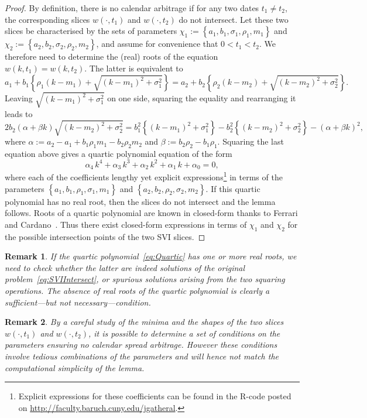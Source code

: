 \documentclass[12pt]{article}
\newtheorem{remark}{Remark}[section]
\numberwithin{equation}{section}
\begin{document}
\begin{proof}
By definition, there is no calendar arbitrage if for any two dates $t_1\ne t_2$,
the corresponding slices $w\left(\cdot,t_1\right)$ and $w\left(\cdot,t_2\right)$ do not intersect.
Let these two slices be characterised by the sets of parameters
$\chi_1:=\left\{a_1,b_1,\sigma_1,\rho_1,m_1\right\}$ and
$\chi_2:=\left\{a_2,b_2,\sigma_2,\rho_2,m_2\right\}$,
and assume for convenience that $0<t_1<t_2$.
We therefore need to determine the (real) roots of the equation
$w\left(k,t_1\right)=w\left(k,t_2\right)$.
The latter is equivalent to
\begin{equation}\label{eq:SVIIntersect}
a_1 + b_1\left\{\rho_1 \left(k - m_1\right)  + \sqrt{\left(k - m_1\right)^2 +\sigma^2_1}\right\}
= a_2 + b_2\left\{\rho_2 \left(k -m_2\right) + \sqrt {\left(k - m_2\right)^2+\sigma^2_2 }\right\}.
\end{equation}
Leaving $\sqrt{\left(k - m_1\right)^2 +\sigma^2_1}$ on one side, squaring the equality and rearranging it leads to
$$
2b_2\left(\alpha+\beta k\right)\sqrt{\left(k-m_2\right)^2+\sigma^2_2}
 = b_1^2\left\{\left(k-m_1\right)^2+\sigma^2_1 \right\}-b_2^2\left\{\left(k-m_2\right)^2 +\sigma^2_2\right\}
 -\left(\alpha+\beta k\right)^2,
$$
where
$\alpha:=a_2-a_1+b_1\rho_1 m_1-b_2\rho_2 m_2$
and
$\beta:=b_2\rho_2-b_1\rho_1$.
Squaring the last equation above gives a quartic polynomial equation of the form
\begin{equation}\label{eq:Quartic}
\alpha_4\,k^4+\alpha_3\,k^3+\alpha_2\,k^2+\alpha_1\,k+\alpha_0=0,
\end{equation}
where each of the coefficients lengthy yet explicit expressions\footnote{Explicit expressions for these coefficients can be found in the R-code posted on \url{http://faculty.baruch.cuny.edu/jgatheral}.} in terms of
the parameters $\left\{a_1,b_1,\rho_1,\sigma_1,m_1\right\}$ and
$\left\{a_2,b_2,\rho_2,\sigma_2,m_2\right\}$.
If this quartic polynomial has no real root, then the slices do not intersect and the lemma follows.
Roots of a quartic polynomial are known in closed-form thanks to Ferrari and Cardano~\cite{Cardano}.
Thus there exist closed-form expressions in terms of $\chi_1$ and $\chi_2$
for the possible intersection points of the two SVI slices.
\end{proof}

\begin{remark}
If the quartic polynomial~\eqref{eq:Quartic} has one or more real roots,
we need to check whether the latter are indeed solutions of the original problem~\eqref{eq:SVIIntersect},
or spurious solutions arising from the two squaring operations.
The absence of real roots of the quartic polynomial is clearly a sufficient---but not necessary---condition.
\end{remark}
\begin{remark}
By a careful study of the minima and the shapes of the two slices $w(\cdot,t_1)$ and $w(\cdot,t_2)$,
it is possible to determine a set of conditions on the parameters ensuring no calendar spread arbitrage.
However these conditions involve tedious combinations of the parameters and will hence not match the computational simplicity of the lemma.
\end{remark}
\end{document}
